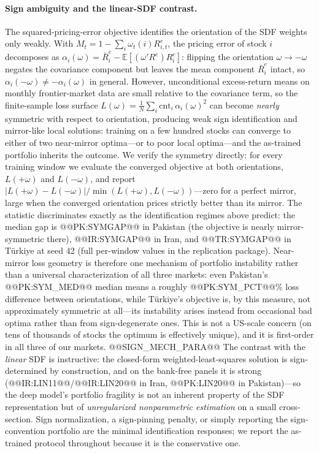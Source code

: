 \documentclass[12pt]{article}
\begin{document}
\paragraph{Sign ambiguity and the linear-SDF contrast.}\label{sec:signconv} The squared-pricing-error objective identifies the orientation of the SDF weights only weakly. With $M_t=1-\sum_i\omega_t(i)R^e_{i,t}$, the pricing error of stock $i$ decomposes as $\alpha_i(\omega)=\bar R^e_i-\mathbb{E}[(\omega'R^e)R^e_i]$: flipping the orientation $\omega\to-\omega$ negates the covariance component but leaves the mean component $\bar R^e_i$ intact, so $\alpha_i(-\omega)\neq-\alpha_i(\omega)$ in general. However, unconditional excess-return means on monthly frontier-market data are small relative to the covariance term, so the finite-sample loss surface $L(\omega)=\frac1N\sum_i \mathrm{cnt}_i\,\alpha_i(\omega)^2$ can become \emph{nearly} symmetric with respect to orientation, producing weak sign identification and mirror-like local solutions: training on a few hundred stocks can converge to either of two near-mirror optima---or to poor local optima---and the as-trained portfolio inherits the outcome. We verify the symmetry directly: for every training window we evaluate the converged objective at both orientations, $L(+\omega)$ and $L(-\omega)$, and report $|L(+\omega)-L(-\omega)|/\min(L(+\omega),L(-\omega))$---zero for a perfect mirror, large when the converged orientation prices strictly better than its mirror. The statistic discriminates exactly as the identification regimes above predict: the median gap is @@PK:SYMGAP@@ in Pakistan (the objective is nearly mirror-symmetric there), @@IR:SYMGAP@@ in Iran, and @@TR:SYMGAP@@ in T\"urkiye at seed 42 (full per-window values in the replication package). Near-mirror loss geometry is therefore one mechanism of portfolio instability rather than a universal characterization of all three markets: even Pakistan's @@PK:SYM_MED@@ median means a roughly @@PK:SYM_PCT@@\% loss difference between orientations, while T\"urkiye's objective is, by this measure, not approximately symmetric at all---its instability arises instead from occasional bad optima rather than from sign-degenerate ones. This is not a US-scale concern (on tens of thousands of stocks the optimum is effectively unique), and it is first-order in all three of our markets. @@SIGN_MECH_PARA@@ The contrast with the \emph{linear} SDF is instructive: the closed-form weighted-least-squares solution is sign-determined by construction, and on the bank-free panels it is strong (@@IR:LIN11@@/@@IR:LIN20@@ in Iran, @@PK:LIN20@@ in Pakistan)---so the deep model's portfolio fragility is not an inherent property of the SDF representation but of \emph{unregularized nonparametric estimation} on a small cross-section. Sign normalization, a sign-pinning penalty, or simply reporting the sign-convention portfolio are the minimal identification responses; we report the as-trained protocol throughout because it is the conservative one.
\end{document}
